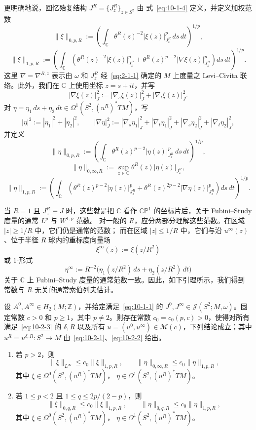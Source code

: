 更明确地说，回忆殆复结构 $J^R=\{J_z^R\}_{z\in S^2}$ 由
式~\eqref{eq:10-1-4} 定义，并定义加权范数
\[
  \|\xi\|_{0,p,R}
  :=\left(
  \int_{\mathbb C}\theta^R(z)^{-2}|\xi(z)|_{J_z^R}^p\,ds\,dt
  \right)^{1/p},
\]
\[
  \|\xi\|_{1,p,R}
  :=\left(
  \int_{\mathbb C}
  \left(
    \theta^R(z)^{-2}|\xi(z)|_{J_z^R}^p
    +\theta^R(z)^{p-2}|\nabla\xi(z)|_{J_z^R}^p
  \right)ds\,dt
  \right)^{1/p}.
\]
这里 $\nabla=\nabla^{R,z}$ 表示由 $\omega$ 和 $J_z^R$ 经~\eqref{eq:2-1-1} 确定的
$M$ 上度量之 Levi--Civita 联络。此外，我们在 $\mathbb C$ 上使用坐标 $z=s+it$，并写
\[
  |\nabla\xi(z)|_J^2
  :=|\nabla_s\xi(z)|_J^2+|\nabla_t\xi(z)|_J^2.
\]
对
$\eta=\eta_1\,ds+\eta_2\,dt\in\Omega^1(S^2,(u^R)^*TM)$，写
\[
  |\eta|^2:=|\eta_1|^2+|\eta_2|^2,
  \qquad
  |\nabla\eta|_J^2
  :=|\nabla_s\eta_1|_J^2+|\nabla_t\eta_1|_J^2
    +|\nabla_s\eta_2|_J^2+|\nabla_t\eta_2|_J^2,
\]
并定义
\[
  \|\eta\|_{0,p,R}
  :=\left(
  \int_{\mathbb C}\theta^R(z)^{p-2}|\eta(z)|_{J_z^R}^p\,ds\,dt
  \right)^{1/p},
\]
\[
  \|\eta\|_{0,\infty,R}
  :=\sup_{z\in\mathbb C}\theta^R(z)|\eta(z)|_{J_z^R},
\]
\[
  \|\eta\|_{1,p,R}
  :=\left(
  \int_{\mathbb C}
  \left(
    \theta^R(z)^{p-2}|\eta(z)|_{J_z^R}^p
    +\theta^R(z)^{2p-2}|\nabla\eta(z)|_{J_z^R}^p
  \right)ds\,dt
  \right)^{1/p}.
\]

当 $R=1$ 且 $J_z^R\equiv J$ 时，这些就是把 $\mathbb C$ 看作
$\mathbb{CP}^1$ 的坐标片后，关于 Fubini--Study 度量的通常 $L^p$ 与 $W^{1,p}$ 范数。
对一般的 $R$，应分两部分理解这些范数。在区域 $|z|\ge1/R$ 中，它们仍是通常的范数；
而在区域 $|z|\le1/R$ 中，它们与沿 $u^\infty(z)$、位于半径 $R$ 球内的重标度向量场
\[
  \xi^\infty(z):=\xi(z/R^2)
\]
或 $1$-形式
\[
  \eta^\infty
  :=R^{-2}\bigl(\eta_1(z/R^2)\,ds+\eta_2(z/R^2)\,dt\bigr)
\]
关于 $\mathbb C$ 上 Fubini--Study 度量的通常范数一致。因此，如下引理所示，我们得到
常数与 $R$ 无关的通常索伯列夫估计。

\begin{lemma}\label{lem:10-3-1}
设 $A^0,A^\infty\in H_2(M;\mathbb Z)$，并给定满足~\eqref{eq:10-1-1} 的
$J^0,J^\infty\in\mathcal J(S^2;M,\omega)$。固定常数 $c>0$ 和 $p\ge1$，其中
$p\ne2$。则存在常数 $c_0=c_0(p,c)>0$，使得对所有满足~\eqref{eq:10-2-3} 的
$\delta,R$ 以及所有 $u=(u^0,u^\infty)\in\mathcal M(c)$，下列结论成立；其中
$u^R=u^{\delta,R}:S^2\to M$ 由~\eqref{eq:10-2-1}、\eqref{eq:10-2-2} 给出。

\begin{enumerate}[label=\textnormal{(\roman*)}]
\item 若 $p>2$，则
\[
  \|\xi\|_{L^\infty}\le c_0\|\xi\|_{1,p,R},
  \qquad
  \|\eta\|_{0,\infty,R}\le c_0\|\eta\|_{1,p,R},
\]
其中
$\xi\in\Omega^0(S^2,(u^R)^*TM)$，
$\eta\in\Omega^1(S^2,(u^R)^*TM)$。

\item 若 $1\le p<2$ 且 $1\le q\le2p/(2-p)$，则
\[
  \|\xi\|_{0,q,R}\le c_0\|\xi\|_{1,p,R},
  \qquad
  \|\eta\|_{0,q,R}\le c_0\|\eta\|_{1,p,R},
\]
其中
$\xi\in\Omega^0(S^2,(u^R)^*TM)$，
$\eta\in\Omega^1(S^2,(u^R)^*TM)$。
\end{enumerate}
\end{lemma}

